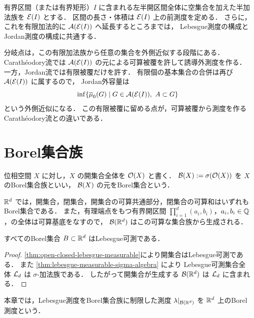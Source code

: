 \begin{remark}[Jordan測度]\label{rem:jordan-caratheodory-branch}
有界区間（または有界矩形）$I$ に含まれる左半開区間全体に空集合を加えた半加法族を
$\mathcal E(I)$ とする．
区間の長さ・体積は $\mathcal E(I)$ 上の前測度を定める．
さらに，これを有限加法的に $\mathcal A(\mathcal E(I))$ へ延長するところまでは，
Lebesgue測度の構成とJordan測度の構成に共通する．

分岐点は，この有限加法族から任意の集合を外側近似する段階にある．
Carathéodory流では $\mathcal A(\mathcal E(I))$ の元による可算被覆を許して誘導外測度を作る．
一方，Jordan流では有限被覆だけを許す．
有限個の基本集合の合併は再び $\mathcal A(\mathcal E(I))$ に属するので，
Jordan外容量は
\[
\inf\{\overline\mu_0(G)\mid G\in\mathcal A(\mathcal E(I)),\ A\subset G\}
\]
という外側近似になる．
この有限被覆に留める点が，可算被覆から測度を作るCarathéodory流との違いである．
\end{remark}

\section{Borel集合族}

\begin{definition}[Borel集合族]\label{def:borel-sigma-algebra}
位相空間 $X$ に対し，$X$ の開集合全体を $\mathcal O(X)$ と書く．
$\mathcal B(X):=\sigma(\mathcal O(X))$ を $X$ のBorel集合族といい，
$\mathcal B(X)$ の元をBorel集合という．
\end{definition}

\begin{example}
$\mathbb R^d$ では，開集合，閉集合，開集合の可算共通部分，閉集合の可算和はいずれもBorel集合である．
また，有理端点をもつ有界開区間
$\prod_{i=1}^d(a_i,b_i)$，$a_i,b_i\in\mathbb Q$，の全体は可算基底をなすので，
$\mathcal B(\mathbb R^d)$ はこの可算な集合族から生成される．
\end{example}

\begin{theorem}[Borel集合はLebesgue可測]\label{thm:borel-sets-are-lebesgue-measurable}
すべてのBorel集合 $B\subset\mathbb R^d$ はLebesgue可測である．
\end{theorem}
\begin{proof}
\cref{thm:open-closed-lebesgue-measurable}により開集合はLebesgue可測である．
また \cref{thm:lebesgue-measurable-sigma-algebra} により
Lebesgue可測集合全体 $\mathcal L_d$ は $\sigma$-加法族である．
したがって開集合が生成する $\mathcal B(\mathbb R^d)$ は $\mathcal L_d$ に含まれる．
\end{proof}

\begin{definition}[Borel測度]\label{def:borel-measure}
本章では，Lebesgue測度をBorel集合族に制限した測度
$\lambda|_{\mathcal B(\mathbb R^d)}$ を $\mathbb R^d$ 上のBorel測度という．
\end{definition}

